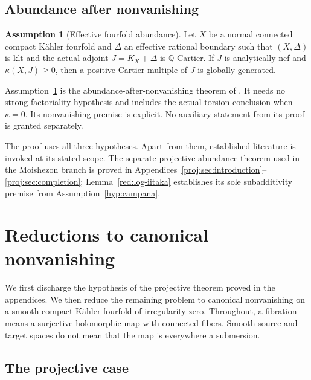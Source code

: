 \documentclass[11pt,letterpaper]{article}
\newcommand{\Q}{\mathbb{Q}}
\theoremstyle{definition}
\newtheorem{assumption}[theorem]{Assumption}
\theoremstyle{remark}
\begin{document}
\subsection{Abundance after nonvanishing}

\begin{assumption}[Effective fourfold abundance]
\label{hyp:effective-abundance}
Let \(X\) be a normal connected compact K\"ahler fourfold and
\(\Delta\) an effective rational boundary such that
\((X,\Delta)\) is klt and the actual adjoint
\(J=K_X+\Delta\) is \(\Q\)-Cartier. If \(J\) is analytically
nef and \(\kappa(X,J)\ge0\), then a positive Cartier multiple of
\(J\) is globally generated.
\end{assumption}

Assumption~\ref{hyp:effective-abundance} is the abundance-after-nonvanishing
theorem of \cite[Theorem~1.1]{GrantEffectiveAbundance}. It needs no strong
factoriality hypothesis and includes the actual torsion conclusion
when \(\kappa=0\). Its nonvanishing premise is explicit. No
auxiliary statement from its proof is granted separately.

The proof uses all three hypotheses. Apart from them, established
literature is invoked at its stated scope. The separate projective
abundance theorem used in the Moishezon branch is proved in
Appendices~\ref{proj:sec:introduction}--\ref{proj:sec:completion};
Lemma~\ref{red:log-iitaka} establishes its sole subadditivity premise
from Assumption~\ref{hyp:campana}.

\section{Reductions to canonical nonvanishing}
\label{red:section}

We first discharge the hypothesis of the projective theorem proved in
the appendices. We then reduce the remaining problem to canonical
nonvanishing on a smooth compact Kähler fourfold of irregularity zero.
Throughout, a fibration means a surjective holomorphic map with connected
fibers. Smooth source and target spaces do not mean that the map is
everywhere a submersion.

\subsection{The projective case}
\end{document}
